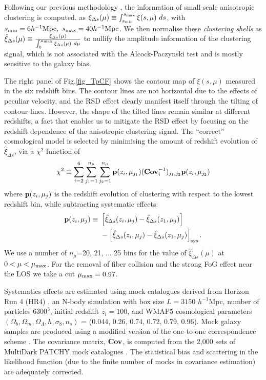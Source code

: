 \documentclass{natureprintstyle}
\let\citep\cite
\let\citet\cite
\begin{document}
Following our previous methodology \citep{Li2016}, the information of small-scale anisotropic clustering is computed.
as $\xi_{\Delta s} (\mu) \equiv \int_{s_{\rm min}}^{s_{\rm max}} \xi (s,\mu)\ ds$, 
with $s_{\rm min}=6 h^{-1} {\rm Mpc},\ s_{\rm max}=40 h^{-1} {\rm Mpc}$.
We then normalise these {\em clustering shells} as 
$\hat\xi_{\Delta s}(\mu) \equiv \frac{\xi_{\Delta s}(\mu)}{\int_{0}^{\mu_{\rm max}}\xi_{\Delta s}(\mu)\ d\mu}$
to nullify the amplitude information of the clustering signal, 
which is not associated with the Alcock-Paczynski test and is mostly sensitive to the galaxy bias.

The right panel of Fig.\ref{fig_TpCF} shows the contour map of $\xi(s,\mu)$ measured in the six redshift bins.
The contour lines are not horizontal due to the effects of peculiar velocity,
and the RSD effect clearly manifest itself through the tilting of contour lines.
However, the shape of the tilted lines remain similar at different redshifts, a fact that enables us  to mitigate the RSD effect by focusing on the redshift dependence of the anisotropic clustering signal.
The ``correct'' cosmological model is selected by minimising the amount of redshift evolution of $\hat\xi_{\Delta s}$,
via a $\chi^2$ function of 
\begin{equation}
 \chi^2\equiv \sum_{i=2}^{6} \sum_{j_1=1}^{n_{\mu}} \sum_{j_2=1}^{n_{\mu}} {\bf p}(z_i,\mu_{j_1}) ({\bf Cov}_{i}^{-1})_{j_1,j_2}  {\bf p}(z_i,\mu_{j_2})
\end{equation}
where ${\bf p}(z_i,\mu_{j})$ is the redshift evolution of clustering with respect to the lowest redshift bin,
while subtracting systematic effects:
\begin{eqnarray}
 {\bf p}(z_i,\mu_{j}) \equiv\ & \left[\hat\xi_{\Delta s}(z_i,\mu_j)-\hat\xi_{\Delta s}(z_1,\mu_j)\right] \\ \nonumber
 &- \left[\hat\xi_{\Delta s}(z_i,\mu_j)-\hat\xi_{\Delta s}(z_1,\mu_j)\right]_{\rm sys}.
\end{eqnarray}
We use a number of $n_{\mu}$=20, 21, ... 25 bins for the value of $\hat\xi_{\Delta s}(\mu)$ at $0<\mu<\mu_{\rm max}$.
For the removal of fiber collision and the strong FoG effect near the LOS we take a cut $\mu_{\rm max} = 0.97$.

Systematics effects are estimated using mock catalogues derived from Horizon Run 4 (HR4) \cite{HR4},
an N-body simulation with box size $L={3150}$ $h^{-1}$Mpc, number of particles $6300^3$,   
initial redshift $z_{i}=100$, and WMAP5\citep{komatsu2011} cosmological parameters 
$(\Omega_{b},\Omega_{m},\Omega_\Lambda,h,\sigma_8,n_s)$  = (0.044, 0.26, 0.74, 0.72, 0.79, 0.96). 
Mock galaxy samples are produced using a modified version of the one-to-one correspondence scheme \citep{hong2016}. 
The covariance matrix, ${\bf Cov}$, is computed from the 2,000 sets of MultiDark PATCHY mock catalogues \citep{MDPATCHY}.
The statistical bias and scattering in the likelihood function (due to the finite number of mocks in covariance estimation) 
are adequately corrected\citet{Hartlap,Percival2014}.
\end{document}
